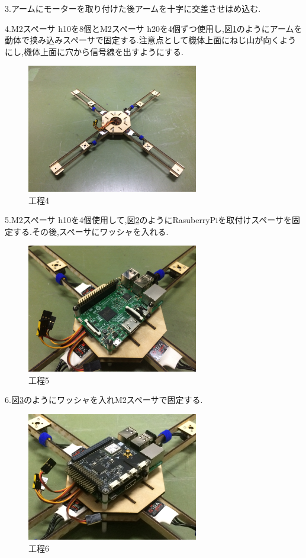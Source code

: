 \documentclass[12pt,oneside]{sotsuken_paper}
\begin{document}
3.アームにモーターを取り付けた後アームを十字に交差させはめ込む.


4.M2スペーサ h10を8個とM2スペーサ h20を4個ずつ使用し,図\ref{fig:kitai2}のようにアームを動体で挟み込みスペーサで固定する.注意点として機体上面にねじ山が向くようにし,機体上面に穴から信号線を出すようにする.

\begin{figure}[htbp]
	\begin{center}
		\includegraphics[width=75mm]{image/kitai/kitai2.jpg}
		\caption{工程4}
		\label{fig:kitai2}
	\end{center}
\end{figure}


5.M2スペーサ h10を4個使用して,図\ref{fig:kitai3}のようにRasuberryPiを取付けスペーサを固定する.その後,スペーサにワッシャを入れる.

\begin{figure}[htbp]
	\begin{center}
		\includegraphics[width=75mm]{image/kitai/kitai3.jpg}
		\caption{工程5}
		\label{fig:kitai3}
	\end{center}
\end{figure}


6.図\ref{fig:kitai4}のようにワッシャを入れM2スペーサで固定する.

\begin{figure}[htbp]
	\begin{center}
		\includegraphics[width=75mm]{image/kitai/kitai4.jpg}
		\caption{工程6}
		\label{fig:kitai4}
	\end{center}
\end{figure}
\end{document}
